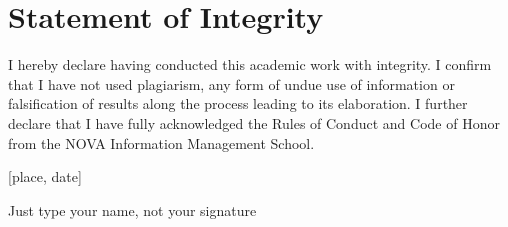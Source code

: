 \chapter*{Statement of Integrity}


I hereby declare having conducted this academic work with integrity. I confirm that I have
not used plagiarism, any form of undue use of information or falsification of results along the
process leading to its elaboration. I further declare that I have fully acknowledged the Rules
of Conduct and Code of Honor from the NOVA Information Management School.

[place, date]

Just type your name, not your signature
